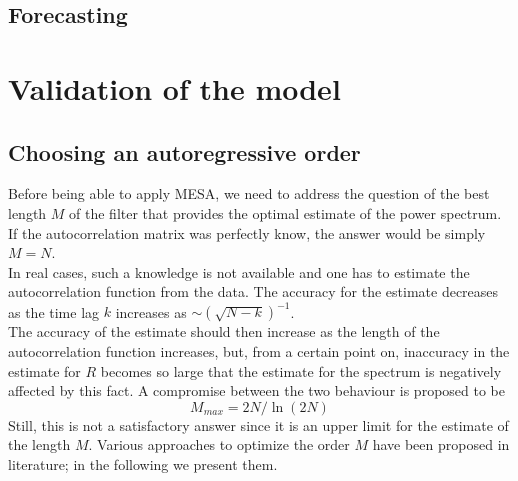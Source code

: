 \documentclass[twocolumn,showpacs,preprintnumbers,nofootinbib,prd,
superscriptaddress,10pt]{revtex4-1}
\begin{document}
\subsection{Forecasting} 

\section{Validation of the model}
\subsection{Choosing an autoregressive order}\label{sec:optimizers} 
Before being able to apply MESA, we need to address the question of the best length $M$ of the filter that provides the optimal estimate of the power spectrum. If the autocorrelation matrix was perfectly know, the answer would be simply $M = N$. \\ 
In real cases, such a knowledge is not available and one has to estimate the autocorrelation function from the data. The accuracy for the estimate decreases as the time lag $k$ increases as $\sim \left(\sqrt{N - k}\right)^{-1}$. \\ 
The accuracy of the estimate should then increase as the length of the autocorrelation function increases, but, from a certain point on, inaccuracy in the estimate for $R$ becomes so large that the estimate for the spectrum is negatively affected by this fact. A compromise between the two behaviour is proposed to be \cite{doi:10.1190/1.1440902}
\begin{equation}\label{eq:MMAx}
M_{max} = 2N / \ln{(2N)}
\end{equation}
Still, this is not a satisfactory answer since it is an upper limit for the estimate of the length $M$.
Various approaches to optimize the order $M$ have been proposed in literature; in the following we present them.
\end{document}
